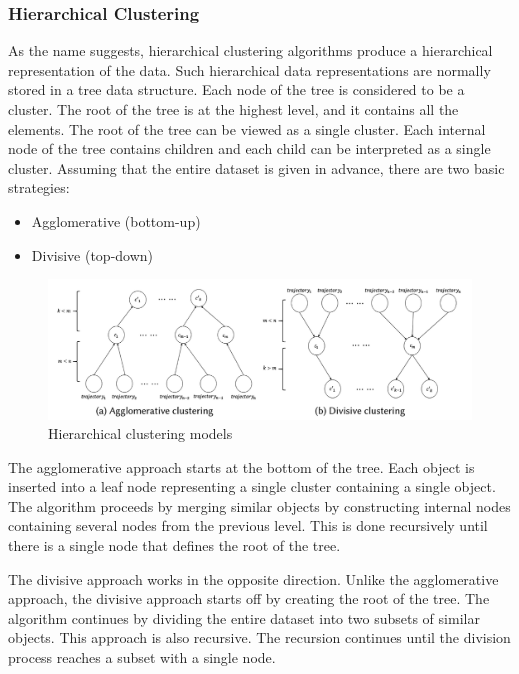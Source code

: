 \documentclass[a4paper, 12pt]{article}
\begin{document}
\subsubsection{Hierarchical Clustering}
As the name suggests, hierarchical clustering algorithms \citep{jain1999data} produce a hierarchical representation of the data. Such hierarchical data representations are normally stored in a tree data structure. Each node of the tree is considered to be a cluster. The root of the tree is at the highest level, and it contains all the elements. The root of the tree can be viewed as a single cluster. Each internal node of the tree contains children and each child can be interpreted as a single cluster. Assuming that the entire dataset is given in advance, there are two basic strategies:

\begin{itemize}
    \item Agglomerative (bottom-up)
    \item Divisive (top-down)
\end{itemize}

\begin{figure}[ht]
    \centering
    \includegraphics[width=1\textwidth]{AP Clustering.png}
    \caption{Hierarchical clustering models \citep{bian2019trajectory}}
    \label{fig13}
\end{figure}

The agglomerative approach starts at the bottom of the tree. Each object is inserted into a leaf node representing a single cluster containing a single object. The algorithm proceeds by merging similar objects by constructing internal nodes containing several nodes from the previous level. This is done recursively until there is a single node that defines the root of the tree.

The divisive approach works in the opposite direction. Unlike the agglomerative approach, the divisive approach starts off by creating the root of the tree. The algorithm continues by dividing the entire dataset into two subsets of similar objects. This approach is also recursive. The recursion continues until the division process reaches a subset with a single node. 
\end{document}
